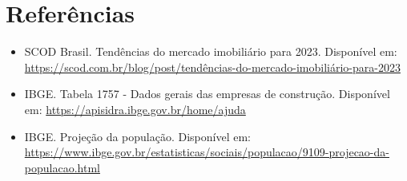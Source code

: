 \documentclass[12pt]{article} \usepackage[utf8]{inputenc}
\begin{document}
\section*{Referências} \begin{itemize} \item SCOD Brasil. Tendências do mercado
    imobiliário para 2023. Disponível em:
    \url{https://scod.com.br/blog/post/tendências-do-mercado-imobiliário-para-2023}
    \item IBGE. Tabela 1757 - Dados gerais das empresas de construção.
        Disponível em: \url{https://apisidra.ibge.gov.br/home/ajuda} \item
IBGE. Projeção da população. Disponível em:
\url{https://www.ibge.gov.br/estatisticas/sociais/populacao/9109-projecao-da-populacao.html}
\end{itemize}
\end{document}
